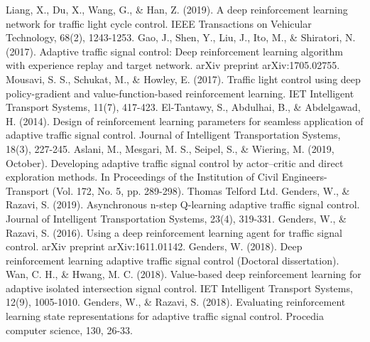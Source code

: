 \documentclass[conference]{IEEEtran}
\begin{document}
\begin{thebibliography}{0}
 Liang, X., Du, X., Wang, G., \& Han, Z. (2019). A deep reinforcement learning network for traffic light cycle control. IEEE Transactions on Vehicular Technology, 68(2), 1243-1253.
 Gao, J., Shen, Y., Liu, J., Ito, M., \& Shiratori, N. (2017). Adaptive traffic signal control: Deep reinforcement learning algorithm with experience replay and target network. arXiv preprint arXiv:1705.02755.
 Mousavi, S. S., Schukat, M., \& Howley, E. (2017). Traffic light control using deep policy-gradient and value-function-based reinforcement learning. IET Intelligent Transport Systems, 11(7), 417-423.
 El-Tantawy, S., Abdulhai, B., \& Abdelgawad, H. (2014). Design of reinforcement learning parameters for seamless application of adaptive traffic signal control. Journal of Intelligent Transportation Systems, 18(3), 227-245.
 Aslani, M., Mesgari, M. S., Seipel, S., \& Wiering, M. (2019, October). Developing adaptive traffic signal control by actor–critic and direct exploration methods. In Proceedings of the Institution of Civil Engineers-Transport (Vol. 172, No. 5, pp. 289-298). Thomas Telford Ltd.
 Genders, W., \& Razavi, S. (2019). Asynchronous n-step Q-learning adaptive traffic signal control. Journal of Intelligent Transportation Systems, 23(4), 319-331.
 Genders, W., \& Razavi, S. (2016). Using a deep reinforcement learning agent for traffic signal control. arXiv preprint arXiv:1611.01142.
 Genders, W. (2018). Deep reinforcement learning adaptive traffic signal control (Doctoral dissertation).
 Wan, C. H., \& Hwang, M. C. (2018). Value-based deep reinforcement learning for adaptive isolated intersection signal control. IET Intelligent Transport Systems, 12(9), 1005-1010.
 Genders, W., \& Razavi, S. (2018). Evaluating reinforcement learning state representations for adaptive traffic signal control. Procedia computer science, 130, 26-33.


\end{thebibliography}
\end{document}
